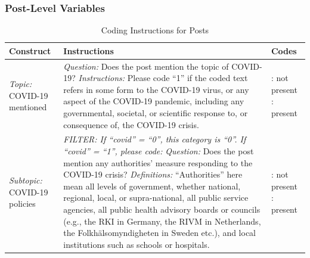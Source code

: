 \documentclass[
]{ccr}
\begin{document}
\hypertarget{post-level-variables}{%
\subsubsection{Post-Level Variables}\label{post-level-variables}}

{
\begin{spacing}{1}
\fontsize{8}{9}\selectfont 
\begin{longtable}[]{@{}
  >{\raggedright\arraybackslash}p{.14\linewidth}
  >{\raggedright\arraybackslash}p{.62\linewidth}
  >{\raggedright\arraybackslash}p{.13\linewidth}@{}}
\caption{Coding Instructions for Posts} \\
\toprule\noalign{}
\textbf{Construct} & \textbf{Instructions} & \textbf{Codes} \\
\midrule\noalign{}
\endhead
\endlastfoot
\emph{Topic:} COVID-19 mentioned & 
\emph{Question:} \newline Does the post mention the topic of COVID-19? \newline \newline
\emph{Instructions:} \newline Please code “1” if the coded text refers in some form to the COVID-19 virus, or any aspect of the COVID-19 pandemic, including any governmental, societal, or scientific response to, or consequence of, the COVID-19 crisis. 
& 
0: not present \newline
1: present
\\
\emph{Subtopic:} \newline
COVID-19 policies
&
\emph{FILTER:  If “covid” = “0”, this category is  “0”. \newline If “covid” = “1”, please code:} \newline \newline 
\emph{Question:} \newline Does the post mention any authorities’ measure responding to the COVID-19 crisis? \newline \newline
\emph{Definitions:} \newline
“Authorities” here mean all levels of government, whether national, regional, local, or supra-national, all public service agencies, all public health advisory boards or councils (e.g., the RKI in Germany, the RIVM in Netherlands, the Folkhälsomyndigheten in Sweden etc.), and local institutions such as schools or hospitals. \newline
& 
0: not present \newline
1: present

\end{longtable}
\end{spacing}}
\end{document}
